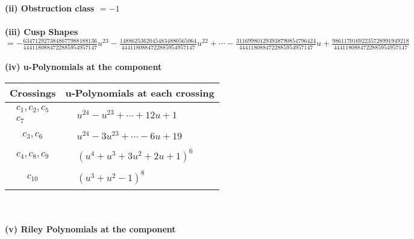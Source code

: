 \documentclass[1p]{elsarticle_modified}
\theoremstyle{definition}
\begin{document}
\flushleft \textbf{(ii) Obstruction class $= -1$}\\~\\
\flushleft \textbf{(iii) Cusp Shapes $= -\frac{6347129273848677988188136}{4441180884722885954957147} u^{23}-\frac{14886253620454834880565064}{4441180884722885954957147} u^{22}+\cdots-\frac{311699801293938790854796424}{4441180884722885954957147} u+\frac{98611701692235728991949218}{4441180884722885954957147}$}\\~\\
\newpage\renewcommand{\arraystretch}{1}
\flushleft \textbf{(iv) u-Polynomials at the component}\newline \\
\begin{tabular}{m{50pt}|m{274pt}}
Crossings & \hspace{64pt}u-Polynomials at each crossing \\
\hline $$\begin{aligned}c_{1},c_{2},c_{5}\\c_{7}\end{aligned}$$&$\begin{aligned}
&u^{24}- u^{23}+\cdots+12 u+1
\end{aligned}$\\
\hline $$\begin{aligned}c_{3},c_{6}\end{aligned}$$&$\begin{aligned}
&u^{24}-3 u^{23}+\cdots-6 u+19
\end{aligned}$\\
\hline $$\begin{aligned}c_{4},c_{8},c_{9}\end{aligned}$$&$\begin{aligned}
&(u^4+u^3+3 u^2+2 u+1)^6
\end{aligned}$\\
\hline $$\begin{aligned}c_{10}\end{aligned}$$&$\begin{aligned}
&(u^3+u^2-1)^8
\end{aligned}$\\
\hline
\end{tabular}\\~\\
\newpage\renewcommand{\arraystretch}{1}
\flushleft \textbf{(v) Riley Polynomials at the component}\newline \\
\end{document}

